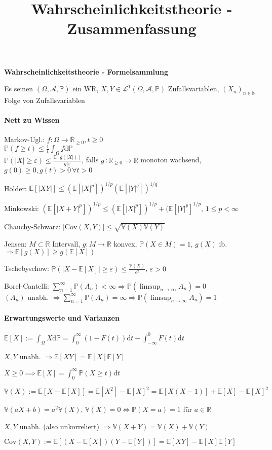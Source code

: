 \documentclass[a4paper,draft]{article}
\newcommand{\R}{\mathds{R}}
\newcommand{\N}{\mathds{N}}
\newcommand{\A}{\mathcal{A}}
\renewcommand{\P}{\mathds{P}}
\newcommand{\E}[1]{\mathds{E}[#1]}
\renewcommand{\d}{\mathrm{d}}
\newcommand{\V}{\mathds{V}}
\newcommand{\parh}{\par\hangindent=0.5cm}
\renewcommand{\wr}{(\Omega,\A,\P)}
\begin{document}
\title{Wahrscheinlichkeitstheorie - Zusammenfassung}
\date{}
\author{}
\setlength{\parindent}{0cm}
\setlength{\parskip}{-0pt}

\begin{center}
\large \bf{Wahrscheinlichkeitstheorie - Formelsammlung}
\end{center}
Es seinen $\wr$ ein WR, $X,Y \in \mathcal{L}^1\wr$ Zufallsvariablen, $(X_n)_{n\in \N}$ Folge von Zufallsvariablen
\begin{multicols}{2}

\paragraph{Nett zu Wissen}\hspace{0pt}\parh
Markov-Ugl.: $f:\Omega \to \overline{\R}_{\geq 0}, t\geq 0$\\
$\P(f \geq t)\leq \frac{1}{t}\int_\Omega f \d\P$\\
$\P(|X|\geq\varepsilon)\leq\frac{\E{g(|X|)}}{g(\varepsilon}$, falls $g$\,:\,$\R_{\geq0}\to\R$ monoton wachsend, $g(0)\geq 0,g(t)>0\,\forall t>0 $\parh
Hölder: $\E{|XY|} \leq (\E{|X|^p})^{1/p}(\E{|Y|^q})^{1/q}$\parh
Minkowski: $(\E{|X+Y|^p})^{1/p} \leq (\E{|X|^p})^{1/p}+(\E{|Y|^p}^{1/p},\,1\leq p < \infty$\parh
Chauchy-Schwarz: $|\mathrm{Cov}(X,Y)| \leq \sqrt{\V(X)\V(Y)}$\parh
Jensen: $M\subset\R$ Intervall, $g:M\to \R$ konvex, $\P(X\in M)=1$, $g(X)$ ib. $\Rightarrow\E{g(X)} \geq g(\E{X})$\parh
Tschebyschow: $\P(|X-\E{X}|\geq \varepsilon) \leq \frac{\V(X)}{\varepsilon^2}$, $\varepsilon > 0$\parh
Borel-Cantelli: $\sum_{n=1}^\infty \P(A_n) < \infty \Rightarrow \P( \limsup_{n\to\infty} A_n) =0$\\
$(A_n)$ {\color{red}unabh.} $\Rightarrow \sum_{n=1}^\infty \P(A_n) = \infty \Rightarrow \P( \displaystyle\limsup_{n\to\infty} A_n) =1$

\paragraph{Erwartungswerte und Varianzen}\hspace{0pt}\parh
$\E{X} := \int_\Omega X\d\P=\int_0^\infty (1-F(t))\d t - \int_{-\infty}^0 F(t)\d t$\parh
$X,Y$ unabh. $\Longrightarrow \E{XY}=\E{X}\E{Y}$\parh
$X \geq 0 \implies \E{X}=\int_0^\infty \P(X \geq t)\d t$\parh
$\V(X):=\E{X-\E{X}}=\E{X^2}-\E{X}^2=\E{X(X-1)}+\E{X}-\E{X}^2$\parh
$\V(aX+b)=a^2\V(X),\,\V(X)=0\Leftrightarrow \P(X=a)=1$ für $a\in\R$\parh
$X,Y$ unabh. (also unkorreliert) $\Longrightarrow \V(X+Y)=\V(X)+\V(Y)$\parh
$\mathrm{Cov}(X,Y):=\E{(X-\E{X})(Y-\E{Y})}=\E{XY}-\E{X}\E{Y}$\parh


\end{multicols}
\end{document}
